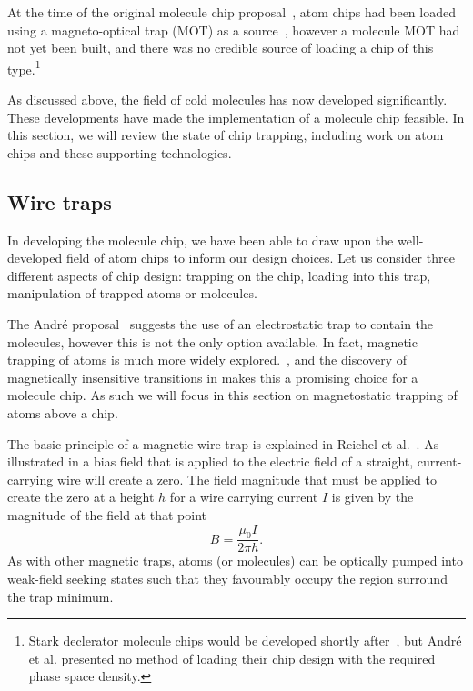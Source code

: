 
At the time of the original molecule chip proposal~\cite{Andre2006}, atom chips
had been loaded using a magneto-optical trap (MOT) as a
source~\cite{Reichel1999, Ott2001}, however a molecule MOT had not yet been
built, and there was no credible source of loading a chip of this
type.\footnote{Stark declerator molecule chips would be developed shortly
after~\cite{Meek1699}, but Andr\'e et al. presented no method of loading their
chip design with the required phase space density.}  

As discussed above, the field of cold molecules has now developed significantly.
These developments have made the implementation of a molecule chip feasible. In
this section, we will review the state of chip trapping, including work on atom
chips and these supporting technologies.

\subsection{Wire traps}
\label{litrev:wiretraps}

In developing the molecule chip, we have been able to draw upon the
well-developed field of atom chips to inform our design choices. Let us consider
three different aspects of chip design: trapping on the chip, loading into this
trap, manipulation of trapped atoms or molecules.

The Andr\'e proposal~\cite{Andre2006} suggests the use of an electrostatic trap
to contain the molecules, however this is not the only option available. In
fact, magnetic trapping of atoms is much more widely explored.~\cite{2011Ac},
and the discovery of magnetically insensitive transitions in \CaF{} makes this a
promising choice for a molecule chip. As such we will focus in this section on
magnetostatic trapping of atoms above a chip.

The basic principle of a magnetic wire trap is explained in Reichel et
al.~\cite{Reichel1999}. As illustrated in  a
bias field that is applied to the electric field of a straight, current-carrying
wire will create a zero. The field magnitude that must be applied to create the
zero at a height $h$ for a wire carrying current $I$ is given by the magnitude
of the field at that point~\cite{Jackson1975}
%
\begin{equation}
  B = \frac{\mu_0 I}{2\pi h}.
  \label{litrev:eqn:bias}
\end{equation}
%
As with other magnetic traps, atoms (or molecules) can be optically pumped into
weak-field seeking states such that they favourably occupy the region surround
the trap minimum.~\cite{Metcalf1999}


